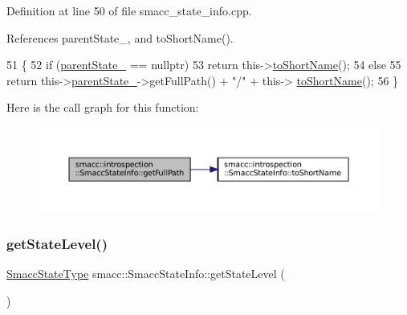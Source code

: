 Definition at line 50 of file smacc\+\_\+state\+\_\+info.\+cpp.



References parent\+State\+\_\+, and to\+Short\+Name().


\begin{DoxyCode}
51 \{
52     \textcolor{keywordflow}{if} (\hyperlink{classsmacc_1_1introspection_1_1SmaccStateInfo_afa49a141d2ccdb3d6f9676ed380ce006}{parentState\_} == \textcolor{keyword}{nullptr})
53         \textcolor{keywordflow}{return} this->\hyperlink{classsmacc_1_1introspection_1_1SmaccStateInfo_a39d7f8a587087b6abd0752058e2d8301}{toShortName}();
54     \textcolor{keywordflow}{else}
55         \textcolor{keywordflow}{return} this->\hyperlink{classsmacc_1_1introspection_1_1SmaccStateInfo_afa49a141d2ccdb3d6f9676ed380ce006}{parentState\_}->getFullPath() + \textcolor{stringliteral}{"/"} + this->
      \hyperlink{classsmacc_1_1introspection_1_1SmaccStateInfo_a39d7f8a587087b6abd0752058e2d8301}{toShortName}();
56 \}
\end{DoxyCode}
Here is the call graph for this function\+:
\nopagebreak
\begin{figure}[H]
\begin{center}
\leavevmode
\includegraphics[width=350pt]{classsmacc_1_1introspection_1_1SmaccStateInfo_a22e625806a74808ee272df5c034d122e_cgraph}
\end{center}
\end{figure}
\mbox{\label{classsmacc_1_1introspection_1_1SmaccStateInfo_a360141a4883f0122a9f5e8b7de456084}} 
\subsubsection{\texorpdfstring{get\+State\+Level()}{getStateLevel()}}
{\footnotesize\ttfamily \hyperlink{namespacesmacc_1_1introspection_a710cf406873961567c11027582c7f720}{Smacc\+State\+Type} smacc\+::\+Smacc\+State\+Info\+::get\+State\+Level (\begin{DoxyParamCaption}{ }\end{DoxyParamCaption})}



